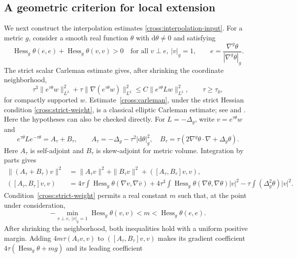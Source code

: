\documentclass[11pt,a4paper]{article}
\theoremstyle{definition}
\theoremstyle{remark}
\newcommand{\dd}{\mathrm d}
\numberwithin{equation}{section}
\begin{document}
\subsection{A geometric criterion for local extension}

We next construct the interpolation estimates
\eqref{cross:interpolation-input}. For a metric $g$, consider a smooth
real function $\theta$ with $\dd\theta\ne0$ and satisfying
\begin{equation}\label{cross:strict-weight}
 \operatorname{Hess}_g\theta(e,e)
  +\operatorname{Hess}_g\theta(v,v)>0
 \quad\text{for all }v\perp e,\ |v|_g=1,
 \qquad e=\frac{\nabla^g\theta}{|\nabla^g\theta|_g}.
\end{equation}
The strict scalar Carleman estimate gives, after shrinking the
coordinate neighborhood,
\begin{equation}\label{cross:carleman}
 \tau^3\|e^{\tau\theta}w\|_{L^2}^2
 +\tau\|\nabla(e^{\tau\theta}w)\|_{L^2}^2
 \le C\|e^{\tau\theta}Lw\|_{L^2}^2,
 \qquad \tau\ge\tau_0,
\end{equation}
for compactly supported $w$.
Estimate~\eqref{cross:carleman}, under the strict Hessian condition
\eqref{cross:strict-weight}, is a classical elliptic Carleman estimate;
see \citet[Chapter~XXVIII]{HormanderIV2009} and
\citet[Definition~8.3 and Theorem~9(a)]{KochTataru2005}.
Here the hypotheses can also be checked directly.  For $L=-\Delta_g$,
write $v=e^{\tau\theta}w$ and
\[
 e^{\tau\theta}Le^{-\tau\theta}=A_\tau+B_\tau,\qquad
 A_\tau=-\Delta_g-\tau^2|\dd\theta|_g^2,\quad
 B_\tau=\tau(2\nabla^g\theta\cdot\nabla+\Delta_g\theta).
\]
Here $A_\tau$ is self-adjoint and $B_\tau$ is skew-adjoint for
metric volume.  Integration by parts gives
\begin{align*}
 \|(A_\tau+B_\tau)v\|^2
 &=\|A_\tau v\|^2+\|B_\tau v\|^2
       +([A_\tau,B_\tau]v,v),\\
 ([A_\tau,B_\tau]v,v)
 &=4\tau\int\operatorname{Hess}_g\theta(\nabla v,\nabla\overline v)
   +4\tau^3\int\operatorname{Hess}_g\theta
                 (\nabla\theta,\nabla\theta)|v|^2
   -\tau\int(\Delta_g^2\theta)|v|^2.
\end{align*}
Condition~\eqref{cross:strict-weight} permits a real constant $m$
such that, at the point under consideration,
\[
 -\min_{v\perp e,\ |v|_g=1}\operatorname{Hess}_g\theta(v,v)
 <m<\operatorname{Hess}_g\theta(e,e).
\]
After shrinking the neighborhood, both inequalities hold with a
uniform positive margin. Adding $4m\tau(A_\tau v,v)$ to
$([A_\tau,B_\tau]v,v)$ makes its gradient coefficient
$4\tau(\operatorname{Hess}_g\theta+mg)$ and its leading coefficient
\end{document}
